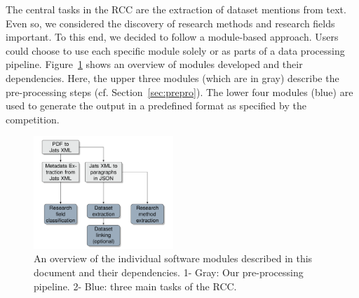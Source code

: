 




The central tasks in the RCC are the extraction of dataset mentions from text. 
Even so, we considered the discovery of research methods and research fields important.
To this end, we decided to follow a module-based approach. Users could choose to use each specific module solely or as parts of a data processing pipeline.
Figure~\ref{figure:pipeline} shows an overview of modules developed and their dependencies.
Here, the upper three modules (which are in gray) describe the pre-processing steps (cf. Section~\ref{sec:prepro}).
The lower four modules (blue) are used to generate the output in a predefined format as specified by the competition.


\begin{figure}[t]
    \includegraphics[width=0.47\textwidth]{figures/information-flow.png}
    \caption{An overview of the individual software modules described in this document and their dependencies. 1- Gray: Our pre-processing pipeline. 2- Blue: three main tasks of the RCC.}
    \label{figure:pipeline}
\end{figure}


